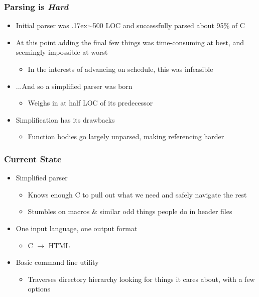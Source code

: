 \documentclass{beamer}
\begin{document}
  \begin{frame}
    \frametitle{Parsing is \emph{Hard}}
    \begin{itemize}
      \item Initial parser was {\raise.17ex\hbox{$\scriptstyle\sim$}}500 LOC and
        successfully parsed about 95\% of C
      \item At this point adding the final few things was time-consuming at
        best, and seemingly impossible at worst
        \begin{itemize}
          \item In the interests of advancing on schedule, this was infeasible
        \end{itemize}
      \item ...And so a simplified parser was born
        \begin{itemize}
          \item Weighs in at half LOC of its predecessor
        \end{itemize}
      \item Simplification has its drawbacks
        \begin{itemize}
          \item Function bodies go largely unparsed, making referencing harder
        \end{itemize}
    \end{itemize}
  \end{frame}

  \begin{frame}
    \frametitle{Current State}
    \begin{itemize}
      \item Simplified parser
        \begin{itemize}
          \item Knows enough C to pull out what we need and safely navigate the
            rest
          \item Stumbles on macros \& similar odd things people do in header
            files
        \end{itemize}
      \item One input language, one output format
        \begin{itemize}
          \item C $\rightarrow$ HTML
        \end{itemize}
      \item Basic command line utility
        \begin{itemize}
          \item Traverses directory hierarchy looking for things it cares about,
            with a few options
        \end{itemize}
    \end{itemize}
  \end{frame}
\end{document}
